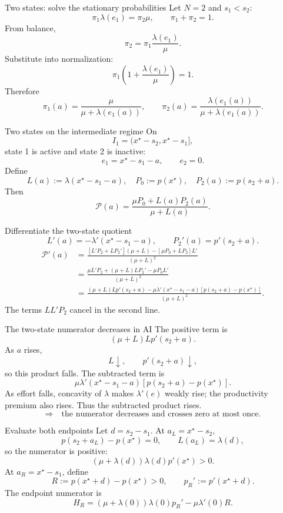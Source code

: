 \documentclass[aspectratio=169,10pt]{beamer}
\newcommand{\calP}{\mathcal{P}}
\begin{document}
\begin{frame}{Two states: solve the stationary probabilities}
Let $N=2$ and $s_1<s_2$:
\[
\pi_1\lambda(e_1)=\pi_2\mu,
\qquad
\pi_1+\pi_2=1.
\]
From balance,
\[
\pi_2=\pi_1\frac{\lambda(e_1)}{\mu}.
\]
Substitute into normalization:
\[
\pi_1\left(
1+\frac{\lambda(e_1)}{\mu}
\right)=1.
\]
Therefore
\[
\boxed{
\pi_1(a)=
\frac{\mu}{\mu+\lambda(e_1(a))},
\qquad
\pi_2(a)=
\frac{\lambda(e_1(a))}
{\mu+\lambda(e_1(a))}.}
\]
\end{frame}

\begin{frame}{Two states on the intermediate regime}
On
\[
I_1=(x^\star-s_2,x^\star-s_1],
\]
state 1 is active and state 2 is inactive:
\[
e_1=x^\star-s_1-a,
\qquad
e_2=0.
\]
Define
\[
L(a):=\lambda(x^\star-s_1-a),
\quad
P_0:=p(x^\star),
\quad
P_2(a):=p(s_2+a).
\]
Then
\[
\boxed{
\calP(a)=
\frac{\mu P_0+L(a)P_2(a)}
{\mu+L(a)}.}
\]
\end{frame}

\begin{frame}{Differentiate the two-state quotient}
\small
\[
L'(a)=
-\lambda'(x^\star-s_1-a),
\qquad
P_2'(a)=p'(s_2+a).
\]
\begin{align*}
\calP'(a)
&=
\frac{
[L'P_2+LP_2'](\mu+L)
-[\mu P_0+LP_2]L'}
{(\mu+L)^2}\\
&=
\frac{
\mu L'P_2
+(\mu+L)LP_2'
-\mu P_0L'}
{(\mu+L)^2}\\
&=
\frac{
(\mu+L)Lp'(s_2+a)
-\mu\lambda'(x^\star-s_1-a)
[p(s_2+a)-p(x^\star)]}
{(\mu+L)^2}.
\end{align*}
The terms $LL'P_2$ cancel in the second line.
\end{frame}

\begin{frame}{The two-state numerator decreases in AI}
The positive term is
\[
(\mu+L)Lp'(s_2+a).
\]
As $a$ rises,
\[
L\downarrow,\qquad p'(s_2+a)\downarrow,
\]
so this product falls.
\vspace{3mm}
The subtracted term is
\[
\mu\lambda'(x^\star-s_1-a)
[p(s_2+a)-p(x^\star)].
\]
As effort falls, concavity of $\lambda$ makes $\lambda'(e)$ weakly rise; the productivity premium also rises. Thus the subtracted product rises.
\[
\Longrightarrow\quad
\text{the numerator decreases and crosses zero at most once.}
\]
\end{frame}

\begin{frame}{Evaluate both endpoints}
Let $d=s_2-s_1$.
\vspace{2mm}
At $a_L=x^\star-s_2$,
\[
p(s_2+a_L)-p(x^\star)=0,
\qquad
L(a_L)=\lambda(d),
\]
so the numerator is positive:
\[
(\mu+\lambda(d))\lambda(d)p'(x^\star)>0.
\]
\vspace{3mm}
At $a_R=x^\star-s_1$, define
\[
R:=p(x^\star+d)-p(x^\star)>0,
\qquad
p_R':=p'(x^\star+d).
\]
The endpoint numerator is
\[
H_R=
(\mu+\lambda(0))\lambda(0)p_R'
-\mu\lambda'(0)R.
\]
\end{frame}
\end{document}
